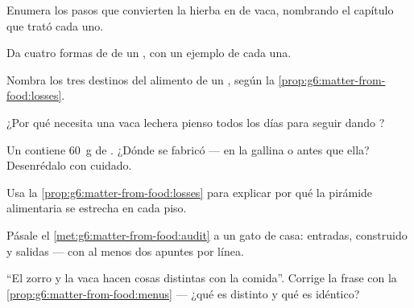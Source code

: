 \begin{exercise}[$\star$]\label{exo:g6:matter-from-food:2}
Enumera los pasos que convierten la hierba en  de vaca,
nombrando el capítulo que trató cada uno.
\end{exercise}

\begin{exercise}[$\star$]\label{exo:g6:matter-from-food:3}
Da cuatro formas de  de un , con un ejemplo
de cada una.
\end{exercise}

\begin{exercise}[$\star$]\label{exo:g6:matter-from-food:4}
Nombra los tres destinos del alimento de un , según la
\cref{prop:g6:matter-from-food:losses}.
\end{exercise}

\begin{exercise}[$\star$]\label{exo:g6:matter-from-food:5}
¿Por qué necesita una vaca lechera pienso todos los días para seguir
dando ?
\end{exercise}

\begin{exercise}[$\star$]\label{exo:g6:matter-from-food:6}
Un  contiene \qty{60}{g} de . ¿Dónde se fabricó
--- en la gallina o antes que ella? Desenrédalo con cuidado.
\end{exercise}

\begin{exercise}[$\star\star$]\label{exo:g6:matter-from-food:7}
Usa la \cref{prop:g6:matter-from-food:losses} para explicar por qué la
pirámide alimentaria se estrecha en cada piso.
\end{exercise}

\begin{exercise}[$\star\star$]\label{exo:g6:matter-from-food:8}
Pásale el \cref{met:g6:matter-from-food:audit} a un gato de casa:
entradas, construido y salidas --- con al menos dos apuntes por línea.
\end{exercise}

\begin{exercise}[$\star\star$]\label{exo:g6:matter-from-food:9}
``El zorro y la vaca hacen cosas distintas con la comida''. Corrige la
frase con la \cref{prop:g6:matter-from-food:menus} --- ¿qué es distinto
y qué es idéntico?
\end{exercise}

